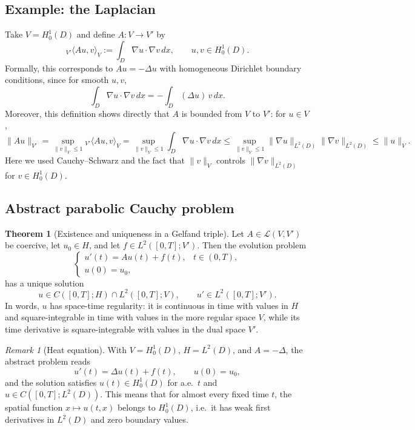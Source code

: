 \documentclass[11pt]{article}
\theoremstyle{definition}
\newtheorem{theorem}{Theorem}
\theoremstyle{remark}
\newtheorem{remark}{Remark}
\newcommand{\dual}[2]{{}_{V'}\langle #1, #2 \rangle_{V}}
\begin{document}
\subsection*{Example: the Laplacian}

Take $V=H_0^1(D)$ and define $A:V\to V'$ by
\[
\dual{Au}{v}
:=
\int_D \nabla u\cdot \nabla v\,dx,
\qquad
u,v\in H_0^1(D).
\]
Formally, this corresponds to $Au=-\Delta u$ with homogeneous Dirichlet boundary conditions, since for smooth $u,v$,
\[
\int_D \nabla u\cdot \nabla v\,dx
=
-\int_D (\Delta u)\,v\,dx.
\]
Moreover, this definition shows directly that $A$ is bounded from $V$ to $V'$: for $u\in V$,
\[
\|Au\|_{V'}
=
\sup_{\|v\|_V\le 1}\dual{Au}{v}
=
\sup_{\|v\|_V\le 1}\int_D \nabla u\cdot \nabla v\,dx
\le
\sup_{\|v\|_V\le 1}\|\nabla u\|_{L^2(D)}\|\nabla v\|_{L^2(D)}
\le
\|u\|_V.
\]
Here we used Cauchy--Schwarz and the fact that $\|v\|_V$ controls $\|\nabla v\|_{L^2(D)}$ for $v\in H_0^1(D)$.

\subsection*{Abstract parabolic Cauchy problem}

\begin{theorem}[Existence and uniqueness in a Gelfand triple]
Let $A\in\mathcal{L}(V,V')$ be coercive, let $u_0\in H$, and let $f\in L^2([0,T];V')$. Then the evolution problem
\[
\begin{cases}
u'(t)=Au(t)+f(t), & t\in(0,T),\\
u(0)=u_0,
\end{cases}
\]
has a unique solution
\[
u\in C([0,T];H)\cap L^2([0,T];V),
\qquad
u'\in L^2([0,T];V').
\]
In words, $u$ has space-time regularity: it is continuous in time with values in $H$ and
square-integrable in time with values in the more regular space $V$, while its time derivative is
square-integrable with values in the dual space $V'$.
\end{theorem}

\begin{remark}[Heat equation]
With $V=H_0^1(D)$, $H=L^2(D)$, and $A=-\Delta$, the abstract problem reads
\[
u'(t)=\Delta u(t)+f(t),
\qquad
u(0)=u_0,
\]
and the solution satisfies $u(t)\in H_0^1(D)$ for a.e.\ $t$ and $u\in C([0,T];L^2(D))$.
This means that for almost every fixed time $t$, the spatial function $x\mapsto u(t,x)$ belongs to
$H_0^1(D)$, i.e.\ it has weak first derivatives in $L^2(D)$ and zero boundary values.
\end{remark}
\end{document}
